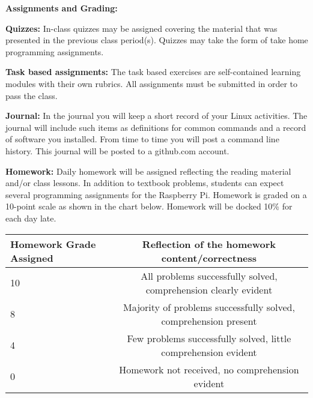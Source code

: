 \documentclass[12pt]{article}
\begin{document}
\vspace*{.15in}



\newpage

\vspace*{.15in}
\noindent\textbf{Assignments and Grading:}







\vspace*{.15in}
\textbf{Quizzes:}  In-class quizzes may be assigned covering the material that was presented in the previous class period(s).  Quizzes may take the form of take home programming assignments.


\vspace*{.15in}
\textbf{Task based assignments:}
The task based exercises are self-contained learning modules with their own rubrics. All assignments must be submitted in order to pass the class.


\vspace*{.15in}
\textbf{Journal:}
In the journal you will keep a short record of your Linux activities. The journal will include such items as definitions for common commands and a record of software you installed. From time to time you will post a command line history. This journal will be posted to a github.com account.



\vspace*{.15in}
\textbf{Homework:}  Daily homework will be assigned reflecting the reading material and/or class lessons.  In addition to textbook problems, students can expect several programming assignments for the Raspberry Pi.  Homework is graded on a 10-point scale as shown in the chart below.  Homework will be docked 10\% for each day late.

    \begin{center}
        \begin{tabular}{ | l | c | }
            \hline
            \textbf{Homework Grade Assigned} & \textbf{Reflection of the homework content/correctness} \\ \hline
            10 & All problems successfully solved, comprehension clearly evident\\ \hline
            8 & Majority of problems successfully solved, comprehension present\\ \hline
            4 & Few problems successfully solved, little comprehension evident \\ \hline
            0 &  Homework not received, no comprehension evident\\
            \hline
        \end{tabular}
    \end{center}
\end{document}
